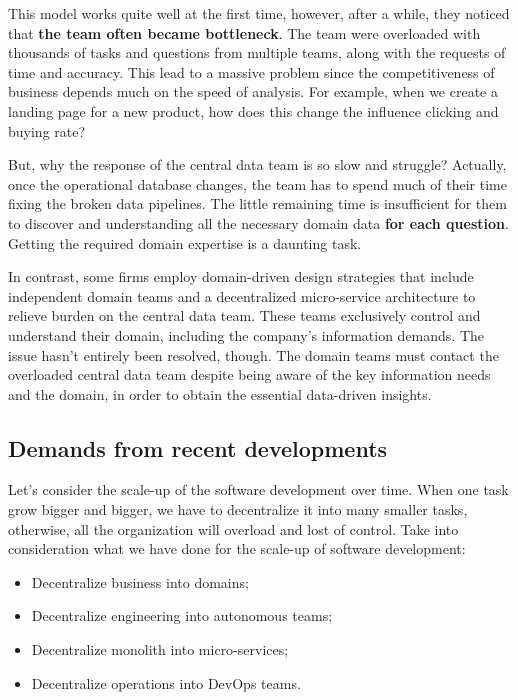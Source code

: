 \documentclass[12pt, a4paper]{book}
\begin{document}
This model works quite well at the first time, however, after a while, they noticed that \textbf{the team often became bottleneck}. The team were overloaded with thousands of tasks and questions from multiple teams, along with the requests of time and accuracy. This lead to a massive problem since the competitiveness of business depends much on the speed of analysis. For example, when we create a landing page for a new product, how does this change the influence clicking and buying rate?

But, why the response of the central data team is so slow and struggle? Actually, once the operational database changes, the team has to spend much of their time fixing the broken data pipelines. The little remaining time is insufficient for them to discover and understanding all the necessary domain data \textbf{for each question}. Getting the required domain expertise is a daunting task. \cite{datamesh2022prologue,datameshweb}

In contrast, some firms employ domain-driven design strategies that include independent domain teams and a decentralized micro-service architecture to relieve burden on the central data team. These teams exclusively control and understand their domain, including the company's information demands. The issue hasn't entirely been resolved, though. The domain teams must contact the overloaded central data team despite being aware of the key information needs and the domain, in order to obtain the essential data-driven insights. \cite{datamesh2022prologue}

\subsection{Demands from recent developments}
Let's consider the scale-up of the software development over time. When one task grow bigger and bigger, we have to decentralize it into many smaller tasks, otherwise, all the organization will overload and lost of control. Take into consideration what we have done for the scale-up of software development:
	\begin{itemize}
		\item Decentralize business into domains;
		\item Decentralize engineering into autonomous teams;
		\item Decentralize monolith into micro-services;
		\item Decentralize operations into DevOps teams.
	\end{itemize}
\end{document}
